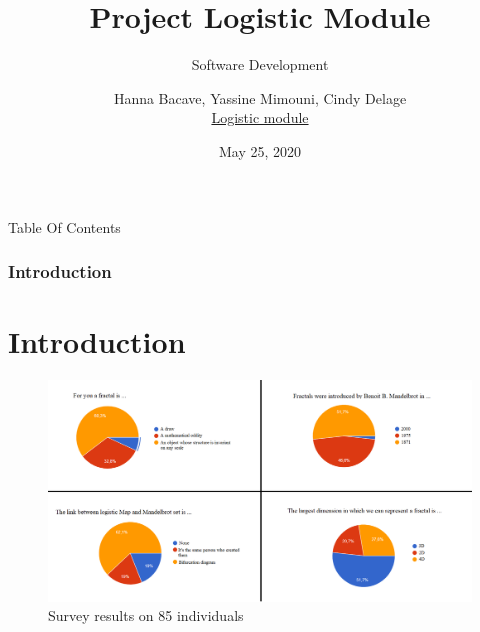 \documentclass [xcolor=svgnames, t] {beamer}
\title[Project Logistic Module]{Project Logistic Module}
\subtitle{Software Development}
\author[C. Delage, H. Bacave, Y. Mimouni]{{Hanna Bacave, Yassine Mimouni, Cindy Delage } \\
\faGithub\href{https://github.com/hannabacave/logistic_module}{ Logistic module} }
\institute[]{Masters MIND-Biostatistic, Montpellier University}
\date{May 25, 2020}
\begin{document}
\begin{frame}
 \titlepage   
\end{frame}

\begin{frame}{Table Of Contents}
\tableofcontents
\end{frame}


\begin{frame}
\frametitle{Introduction}
\section{Introduction}
    \begin{figure}[!h]
    \begin{center}
   \caption{\label{étiquette} Survey results on 85 individuals}
   \includegraphics[width=12cm]{sondage.png}
   \end{center}
    \end{figure}
\end{frame}
\end{document}
